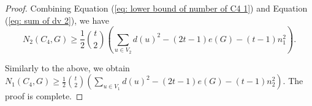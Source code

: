 \documentclass[10pt,a4paper]{amsart}
\begin{document}
\begin{proof}
            Combining Equation (\ref{eq: lower bound of number of C4 1}) and Equation (\ref{eq: sum of dv 2}), we have
            \begin{equation*}
                N_2(C_4, G) \geq \frac{1}{2} \binom{t}{2} \left(\sum_{u \in V_2} d(u)^2 - (2t-1) e(G) - (t-1) n_1^2 \right).
            \end{equation*}

            Similarly to the above, we obtain $N_1(C_4, G) \geq \frac{1}{2} \binom{t}{2} (\sum_{u \in V_1} d(u)^2 - (2t-1) e(G) - (t-1) n_2^2)$.
            The proof is complete.
        \end{proof}
\end{document}

